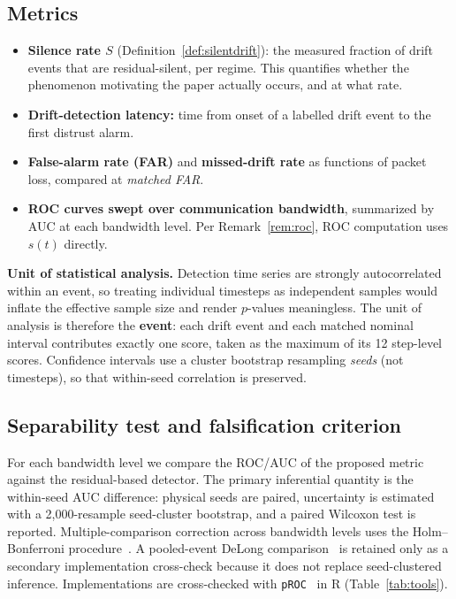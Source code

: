 \documentclass[journal]{IEEEtran}
\theoremstyle{plain}
\theoremstyle{definition}
\theoremstyle{remark}
\begin{document}
\subsection{Metrics}
\begin{itemize}
\item \textbf{Silence rate $S$} (Definition~\ref{def:silentdrift}): the
measured fraction of drift events that are residual-silent, per regime.
This quantifies whether the phenomenon motivating the paper actually
occurs, and at what rate.
\item \textbf{Drift-detection latency:} time from onset of a labelled
drift event to the first distrust alarm.
\item \textbf{False-alarm rate (FAR)} and \textbf{missed-drift rate} as
functions of packet loss, compared at \emph{matched FAR}.
\item \textbf{ROC curves swept over communication bandwidth}, summarized
by AUC at each bandwidth level. Per Remark~\ref{rem:roc}, ROC computation
uses $s(t)$ directly.
\end{itemize}

\noindent\textbf{Unit of statistical analysis.} Detection time series are
strongly autocorrelated within an event, so treating individual timesteps
as independent samples would inflate the effective sample size and render
$p$-values meaningless. The unit of analysis is therefore the
\textbf{event}: each drift event and each matched nominal interval
contributes exactly one score, taken as the maximum of its 12 step-level
scores. Confidence intervals use a cluster bootstrap resampling
\emph{seeds} (not timesteps), so that within-seed correlation is
preserved.

\subsection{Separability test and falsification criterion}
For each bandwidth level we compare the ROC/AUC of the proposed metric
against the residual-based detector. The primary inferential quantity is
the within-seed AUC difference: physical seeds are paired, uncertainty is
estimated with a 2,000-resample seed-cluster bootstrap, and a paired
Wilcoxon test is reported. Multiple-comparison correction across bandwidth
levels uses the Holm--Bonferroni procedure~\cite{holm1979}. A pooled-event
DeLong comparison~\cite{delong1988,sun2014} is retained only as a
secondary implementation cross-check because it does not replace
seed-clustered inference. Implementations are cross-checked with
\texttt{pROC}~\cite{robin2011} in R (Table~\ref{tab:tools}).
\end{document}
